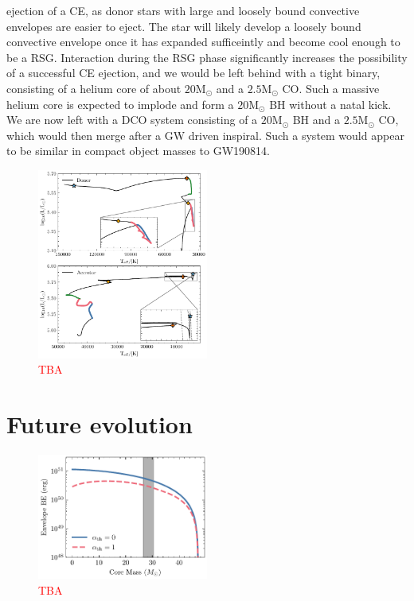 \documentclass[linenumbers,trackchanges,twocolumn]{aastex701}
\newcommand{\Mdot}{\mathrm{M}_{\odot}}
\newcommand{\red}{\textcolor{red}}
\begin{document}
ejection of a CE, as donor stars with large and loosely bound convective envelopes are easier to eject. The star will likely develop a loosely bound convective envelope once it has expanded sufficeintly and become cool enough to be a RSG. Interaction during the RSG phase significantly increases the possibility of a successful CE ejection, and we would be left behind with a tight binary, consisting of a helium core of about $20\Mdot$ and a $2.5\Mdot$ CO. Such a massive helium core is expected to implode and form a $20\Mdot$ BH without a natal kick. We are now left with a DCO system consisting of a $20\Mdot$ BH and a $2.5\Mdot$ CO, which would then merge after a GW driven inspiral. Such a system would appear to be similar in compact object masses to GW190814.

\begin{figure}[htbp]
    \centering
    \includegraphics[width=0.5\textwidth]{gw_fiducial_hr.pdf}
    \caption{\red{TBA}}
    \label{fig:gw_hr}
\end{figure}

\section{Future evolution}

\begin{figure}[htbp]
    \centering
    \includegraphics[width=0.5\textwidth]{xrb_be.pdf}
    \caption{\red{TBA}}
    \label{fig:xrb_be}
\end{figure}
\end{document}
